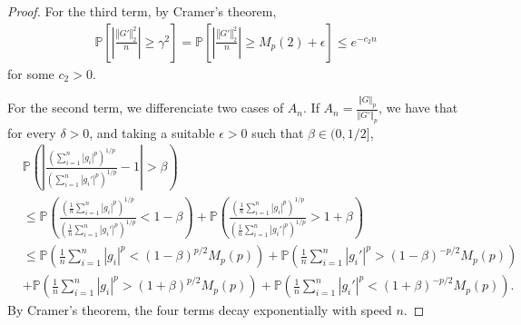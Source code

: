 \documentclass[10pt]{amsart}
\newcounter{theor}
\numberwithin{equation}{section}
\begin{document}
\begin{proof}
For the third term, by Cramer's theorem, 
\begin{align*}
\mathbb{P} \left[ \left|  \frac{  \left\Vert G'  \right\Vert_2 ^2   }{n} \right|  \geq  \gamma  ^2 \right] = \mathbb{P} \left[ \left|  \frac{  \left\Vert G'  \right\Vert_2 ^2   }{n} \right|  \geq  M_p(2) + \epsilon   \right] \leq e^{-c_2 n}
\end{align*}
for some $c_2 >0$.




For the second term, we differenciate two cases of $A_n$. If $A_n = \frac{\Vert G \Vert _p}{\Vert G' \Vert _p}$, we have that for every $\delta >0$, and taking a suitable $\epsilon>0$ such that $\beta \in (0, 1/2]$,
\begin{align*}
& \mathbb{P} \left( \left| \frac{\left(\sum _{i=1}^n \left| g_i  \right|^p  \right)^{1/p} }{\left(\sum _{i=1}^n \left| g_i'  \right|^p \right)^{1/p}} - 1 \right| > \beta \right)  
 \\
 & \leq \mathbb{P} \left(  \frac{ \left( \frac{1}{n} \sum _{i=1}^n \left| g_i  \right|^p  \right)^{1/p} }{\left(\frac{1}{n}\sum _{i=1}^n \left| g_i'  \right|^p \right)^{1/p}} < 1- \beta \right) + 
 \mathbb{P} \left(  \frac{ \left( \frac{1}{n} \sum _{i=1}^n \left| g_i  \right|^p  \right)^{1/p} }{\left(\frac{1}{n}\sum _{i=1}^n \left| g_i'  \right|^p \right)^{1/p}} > 1+ \beta \right)
  \\
  & \leq \mathbb{P} \left( \frac{1}{n} \sum _{i=1}^n \left| g_i  \right|^p  < (1- \beta)^{p/2} M_p(p) \right)
  + \mathbb{P} \left( \frac{1}{n} \sum _{i=1}^n \left| g_i'  \right|^p  > (1- \beta)^{-p/2} M_p(p) \right)
  \\
  & + \mathbb{P} \left( \frac{1}{n} \sum _{i=1}^n \left| g_i  \right|^p  > (1+ \beta)^{p/2} M_p(p) \right)
  + \mathbb{P} \left( \frac{1}{n} \sum _{i=1}^n \left| g_i'  \right|^p  < (1+ \beta)^{-p/2} M_p(p) \right).
\end{align*} 
By Cramer's theorem, the four terms decay exponentially with speed $n$.


\end{proof}
\end{document}
